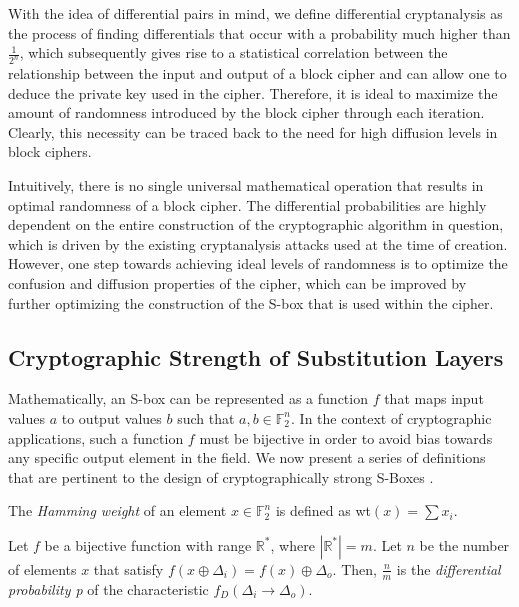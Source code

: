 \documentclass[11pt]{article}
\newcommand{\field}[1]{\mathbb{#1}} %
\begin{document}
With the idea of differential pairs in mind, we define differential cryptanalysis as the process of finding differentials that occur with a probability much higher than $\frac{1}{2^n}$, which subsequently gives rise to a statistical correlation between the relationship between the input and output of a block cipher and can allow one to deduce the private key used in the cipher. Therefore, it is ideal to maximize the amount of randomness introduced by the block cipher through each iteration. Clearly, this necessity can be traced back to the need for high diffusion levels in block ciphers.

Intuitively, there is no single universal mathematical operation that results in optimal randomness of a block cipher. The differential probabilities are highly dependent on the entire construction of the cryptographic algorithm in question, which is driven by the existing cryptanalysis attacks used at the time of creation. However, one step towards achieving ideal levels of randomness is to optimize the confusion and diffusion properties of the cipher, which can be improved by further optimizing the construction of the S-box that is used within the cipher.
\subsection{Cryptographic Strength of Substitution Layers}
Mathematically, an S-box can be represented as a function $f$ that maps input values $a$ to output values $b$ such that $a,b \in \field{F}_2^n$. In the context of cryptographic applications, such a function $f$ must be bijective in order to avoid bias towards any specific output element in the field. We now present a series of definitions that are pertinent to the design of cryptographically strong S-Boxes \cite{Mar_newanalysis}.


\begin{define}
The \emph{Hamming weight} of an element $x \in \field{F}_2^n$ is defined as wt$(x) = \sum x_i$.
\end{define}

\begin{define}
Let $f$ be a bijective function with range $\mathbb{R^*}$, where $|\mathbb{R^*}| = m$. Let $n$ be the number of elements $x$ that satisfy $f(x \oplus \Delta_i) = f(x) \oplus \Delta_o$. Then, $\frac{n}{m}$ is the \emph{differential probability p} of the characteristic $f_D(\Delta_i \to \Delta_o)$.
\end{define}
\end{document}
